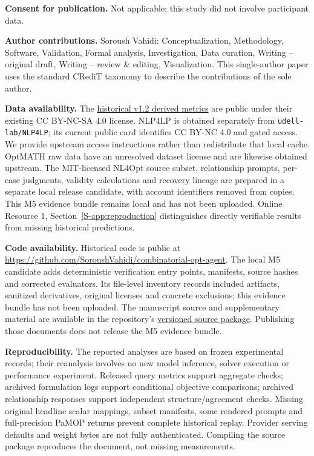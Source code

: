 \documentclass[pdflatex,iicol,sn-basic,Numbered]{sn-jnl}
\begin{document}
\noindent\textbf{Consent for publication.} Not applicable; this study did not involve participant data.

\noindent\textbf{Author contributions.} Soroush Vahidi: Conceptualization, Methodology, Software, Validation, Formal analysis, Investigation, Data curation, Writing -- original draft, Writing -- review \& editing, Visualization. This single-author paper uses the standard CRediT taxonomy to describe the contributions of the sole author.

\noindent\textbf{Data availability.} The \href{https://huggingface.co/datasets/SoroushVahidi/nl-optimization-instantiation-metrics}{historical v1.2 derived metrics} are public under their existing CC BY-NC-SA 4.0 license. NLP4LP is obtained separately from \texttt{udell-lab/NLP4LP}; its current public card identifies CC BY-NC 4.0 and gated access. We provide upstream access instructions rather than redistribute that local cache. OptMATH raw data have an unresolved dataset license and are likewise obtained upstream. The MIT-licensed NL4Opt source subset, relationship prompts, per-case judgments, validity calculations and recovery lineage are prepared in a separate local release candidate, with account identifiers removed from copies. This M5 evidence bundle remains local and has not been uploaded. Online Resource 1, Section~\ref{S-app:reproduction} distinguishes directly verifiable results from missing historical predictions.

\noindent\textbf{Code availability.} Historical code is public at \url{https://github.com/SoroushVahidi/combinatorial-opt-agent}. The local M5 candidate adds deterministic verification entry points, manifests, source hashes and corrected evaluators. Its file-level inventory records included artifacts, sanitized derivatives, original licenses and concrete exclusions; this evidence bundle has not been uploaded. The manuscript source and supplementary material are available in the repository's \href{https://github.com/SoroushVahidi/combinatorial-opt-agent/tree/main/manuscript/jdsa/source}{versioned source package}. Publishing those documents does not release the M5 evidence bundle.

\noindent\textbf{Reproducibility.} The reported analyses are based on frozen experimental records; their reanalysis involves no new model inference, solver execution or performance experiment. Released query metrics support aggregate checks; archived formulation logs support conditional objective comparisons; archived relationship responses support independent structure/agreement checks. Missing original headline scalar mappings, subset manifests, some rendered prompts and full-precision PaMOP returns prevent complete historical replay. Provider serving defaults and weight bytes are not fully authenticated. Compiling the source package reproduces the document, not missing measurements.
\end{document}
